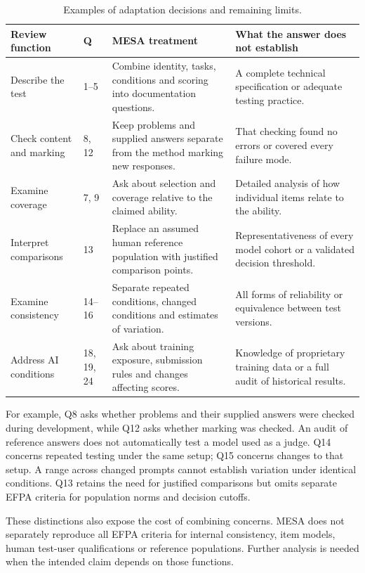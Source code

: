 \documentclass[10pt,conference]{IEEEtran}
\begin{document}
\begin{table}[t]
\caption{Examples of adaptation decisions and remaining limits.}
\label{tab:adaptation}
\small
\begin{tabularx}{\textwidth}{@{}p{}p{}XX@{}}
\toprule
Review function & Q & MESA treatment & What the answer does not establish \\
\midrule
Describe the test & 1--5 & Combine identity, tasks, conditions and scoring into documentation questions. & A complete technical specification or adequate testing practice. \\
Check content and marking & 8, 12 & Keep problems and supplied answers separate from the method marking new responses. & That checking found no errors or covered every failure mode. \\
Examine coverage & 7, 9 & Ask about selection and coverage relative to the claimed ability. & Detailed analysis of how individual items relate to the ability. \\
Interpret comparisons & 13 & Replace an assumed human reference population with justified comparison points. & Representativeness of every model cohort or a validated decision threshold. \\
Examine consistency & 14--16 & Separate repeated conditions, changed conditions and estimates of variation. & All forms of reliability or equivalence between test versions. \\
Address AI conditions & 18, 19, 24 & Ask about training exposure, submission rules and changes affecting scores. & Knowledge of proprietary training data or a full audit of historical results. \\
\bottomrule
\end{tabularx}
\end{table}

For example, Q8 asks whether problems and their supplied answers were checked during development, while Q12 asks whether marking was checked. An audit of reference answers does not automatically test a model used as a judge. Q14 concerns repeated testing under the same setup; Q15 concerns changes to that setup. A range across changed prompts cannot establish variation under identical conditions. Q13 retains the need for justified comparisons but omits separate EFPA criteria for population norms and decision cutoffs.

These distinctions also expose the cost of combining concerns. MESA does not separately reproduce all EFPA criteria for internal consistency, item models, human test-user qualifications or reference populations. Further analysis is needed when the intended claim depends on those functions.
\end{document}
